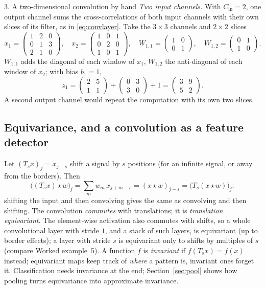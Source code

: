 \documentclass[11pt]{article}
\newcommand{\Cin}{C_{\mathrm{in}}}
\begin{document}
\begin{worked}{3. A two-dimensional convolution by hand}
\emph{Two input channels.} With $\Cin = 2$, one output channel sums the cross-correlations of both input channels with
their own slices of its filter, as in \eqref{eq:convlayer}. Take the $3 \times 3$ channels and $2 \times 2$ slices
\[
  x_1 = \begin{pmatrix} 1 & 2 & 0 \\ 0 & 1 & 3 \\ 2 & 1 & 0 \end{pmatrix}, \quad
  x_2 = \begin{pmatrix} 1 & 0 & 1 \\ 0 & 2 & 0 \\ 1 & 0 & 1 \end{pmatrix}, \quad
  W_{1,1} = \begin{pmatrix} 1 & 0 \\ 0 & 1 \end{pmatrix}, \quad
  W_{1,2} = \begin{pmatrix} 0 & 1 \\ 1 & 0 \end{pmatrix}.
\]
$W_{1,1}$ adds the diagonal of each window of $x_1$, $W_{1,2}$ the anti-diagonal of each window of $x_2$; with bias $b_1 = 1$,
\[
  z_{1} = \begin{pmatrix} 2 & 5 \\ 1 & 1 \end{pmatrix} + \begin{pmatrix} 0 & 3 \\ 3 & 0 \end{pmatrix} + 1
  = \begin{pmatrix} 3 & 9 \\ 5 & 2 \end{pmatrix} .
\]
A second output channel would repeat the computation with its own two slices.
\end{worked}

\subsection{Equivariance, and a convolution as a feature detector}\label{sec:equiv}

Let $(T_s x)_j = x_{j - s}$ shift a signal by $s$ positions (for an infinite signal, or away from the borders). Then
\[
  \big((T_s x) \star w\big)_j = \sum_m w_m\, x_{j + m - s} = (x \star w)_{j - s} = \big(T_s(x \star w)\big)_j :
\]
shifting the input and then convolving gives the same as convolving and then shifting. The convolution
\emph{commutes} with translations; it is \emph{translation equivariant}. The element-wise activation also commutes
with shifts, so a whole convolutional layer with stride $1$, and a stack of such layers, is equivariant (up to border
effects); a layer with stride $s$ is equivariant only to shifts by multiples of $s$ (compare Worked example~5). A function $f$
is \emph{invariant} if $f(T_s x) = f(x)$ instead; equivariant maps keep track of \emph{where} a pattern is, invariant
ones forget it. Classification needs invariance at the end; Section~\ref{sec:pool} shows how pooling turns equivariance
into approximate invariance.
\end{document}
